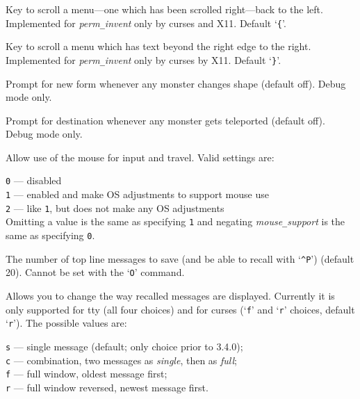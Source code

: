 \item[\ib{menu\verb+_+shift\verb+_+left}]
Key to scroll a menu---one which has been
scrolled right---back to the left.
Implemented for {\it perm\verb+_+invent\/} only by curses and X11.
Default `{\tt \verb+{+}'.

\item[\ib{menu\verb+_+shift\verb+_+right}]
Key to scroll a menu which has text beyond the
right edge to the right.
Implemented for {\it perm\verb+_+invent\/} only by curses by X11.
Default `{\tt \verb+}+}'.
\item[\ib{monpolycontrol}]
Prompt for new form whenever any monster changes shape (default off).
Debug mode only.
\item[\ib{montelecontrol}]
Prompt for destination whenever any monster gets teleported (default off).
Debug mode only.
\item[\ib{mouse\verb+_+support}]
Allow use of the mouse for input and travel.
Valid settings are:

{\tt 0} --- disabled\\
{\tt 1} --- enabled and make OS adjustments to support mouse use\\
{\tt 2} --- like {\tt 1}, but does not make any OS adjustments\\

Omitting a value is the same as specifying {\tt 1}
and negating
{\it mouse\verb+_+support\/}
is the same as specifying {\tt 0}.
\item[\ib{msghistory}]
The number of top line messages to save (and be able to recall
with `{\tt \^{}P}') (default 20).
Cannot be set with the `{\tt O}' command.
\item[\ib{msg\verb+_+window}]
Allows you to change the way recalled messages are displayed.
Currently it is only supported for tty (all four choices) and for curses
(`{\tt f}' and `{\tt r}' choices, default `{\tt r}').
The possible values are:

{\tt s} --- single message (default; only choice prior to 3.4.0);\\
{\tt c} --- combination, two messages as {\it single\/}, then as {\it full\/};\\
{\tt f} --- full window, oldest message first;\\
{\tt r} --- full window reversed, newest message first.

